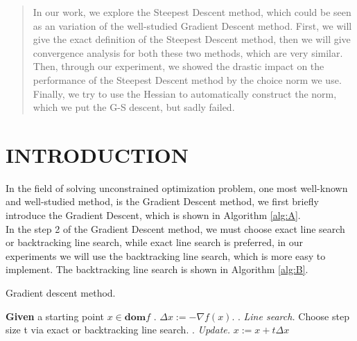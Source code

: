 \documentclass{article}
\begin{document}
\begin{abstract}
In our work, we explore the Steepest Descent method, which could be seen as an variation of the well-studied Gradient Descent method. First, we will give the exact definition of the Steepest Descent method, then we will give convergence analysis for both these two methods, which are very similar. \\
Then, through our experiment, we showed the drastic impact on the performance of the Steepest Descent method by the choice norm we use. Finally, we try to use the Hessian to automatically construct the norm, which we put the G-S descent, but sadly failed.
\end{abstract}


\section{INTRODUCTION}
In the field of solving unconstrained optimization problem, one most well-known and well-studied method, is the Gradient Descent method, we first briefly introduce the Gradient Descent, which is shown in Algorithm \ref{alg:A}.\\
In the step 2 of the Gradient Descent method, we must choose exact line search or backtracking line search, while exact line search is preferred, in our experiments we will use the backtracking line search, which is more easy to implement. The backtracking line search is shown in Algorithm \ref{alg:B}.
\begin{algorithm}\caption{\label{alg:A}Gradient descent method.}
\begin{algorithmic}
\STATE \textbf{Given} a starting point $x \in \textbf{dom} f$
\REPEAT
{}. $\Delta x:=-\nabla f\left( x\right) $.
. \textit{Line search.} Choose step size t via exact or backtracking line search.
. \textit{Update.} $x:=x+t\Delta x$
\end{algorithmic}
\end{algorithm}
\end{document}
